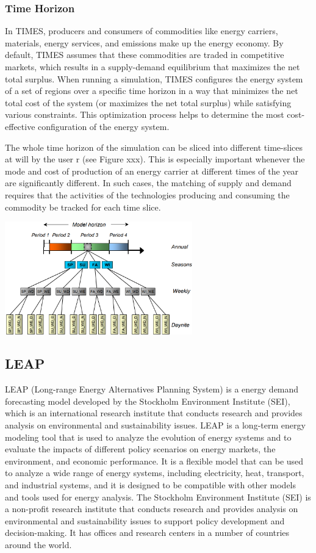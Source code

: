 \documentclass[lettersize,journal]{IEEEtran}
\begin{document}
  \subsubsection{Time Horizon}
  In TIMES, producers and consumers of commodities like energy carriers, materials, energy services, and emissions make up the energy economy. By default, TIMES assumes that these commodities are traded in competitive markets, which results in a supply-demand equilibrium that maximizes the net total surplus. When running a simulation, TIMES configures the energy system of a set of regions over a specific time horizon in a way that minimizes the net total cost of the system (or maximizes the net total surplus) while satisfying various constraints. This optimization process helps to determine the most cost-effective configuration of the energy system.

  The whole time horizon of the simulation can be sliced into different time-slices at will by the user r (see Figure xxx). This is especially important whenever the mode and cost of production of an energy carrier at different times of the year are significantly different.  In such cases, the matching of supply and demand requires that the activities of the technologies producing and consuming the commodity be tracked for each time slice. 

  \centering
  \includegraphics[width=3.2in]{time_horizon.png}



  \subsection{LEAP}
  LEAP (Long-range Energy Alternatives Planning System) is a energy demand forecasting model developed by the Stockholm Environment Institute (SEI), which is an international research institute that conducts research and provides analysis on environmental and sustainability issues. LEAP is a long-term energy modeling tool that is used to analyze the evolution of energy systems and to evaluate the impacts of different policy scenarios on energy markets, the environment, and economic performance. It is a flexible model that can be used to analyze a wide range of energy systems, including electricity, heat, transport, and industrial systems, and it is designed to be compatible with other models and tools used for energy analysis. The Stockholm Environment Institute (SEI) is a non-profit research institute that conducts research and provides analysis on environmental and sustainability issues to support policy development and decision-making. It has offices and research centers in a number of countries around the world.
\end{document}
